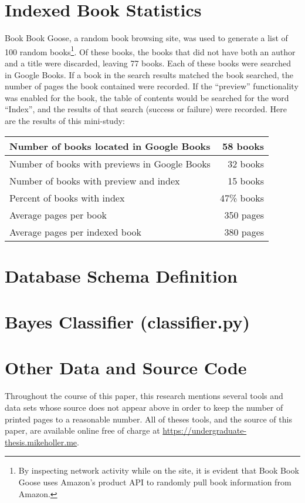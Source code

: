 \newpage \appendix \appendixpage \addappheadtotoc
\section{Indexed Book Statistics}
\label{appendix:d}

Book Book Goose\cite{book-book-goose}, a random book browsing site, was used to generate a list of 100 random books\footnote{By inspecting network activity while on the site, it is evident that Book Book Goose uses Amazon's product API\cite{amazon-products} to randomly pull book information from Amazon.}.
Of these books, the books that did not have both an author and a title were discarded, leaving 77 books.
Each of these books were searched in Google Books\cite{google-books}.
If a book in the search results matched the book searched, the number of pages the book contained were recorded.
If the ``preview'' functionality was enabled for the book, the table of contents would be searched for the word ``Index'', and the results of that search (success or failure) were recorded.
Here are the results of this mini-study:

\begin{center}
\begin{tabular}{|l|r|}
\hline 
Number of books located in Google Books & 58 books \\ 
\hline 
Number of books with previews in Google Books & 32 books \\ 
\hline 
Number of books with preview and index & 15 books \\ 
\hline 
Percent of books with index & 47\% books \\ 
\hline
Average pages per book & 350 pages \\ 
\hline 
Average pages per indexed book & 380 pages \\ 
\hline 
\end{tabular}
\end{center}


\section{Database Schema Definition}
\label{appendix:a}


\section{\Naive Bayes Classifier (classifier.py)}
\label{appendix:b}


\section{Other Data and Source Code}
\label{appendix:c}

Throughout the course of this paper, this research mentions several tools and data sets whose source does not appear above in order to keep the number of printed pages to a reasonable number.
All of theses tools, and the source of this paper, are available online free of charge at \url{https://undergraduate-thesis.mikeholler.me}.